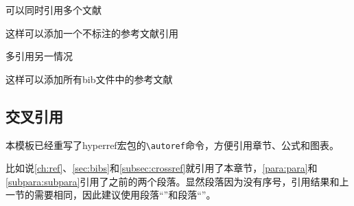 \documentclass{CustGraduPaper}
\begin{document}
可以同时引用多个文献\cite{Stone_1998,9780124467422,huagongrenzheng2014}

这样可以添加一个不标注的参考文献引用\nocite{9787508342894}

多引用另一情况\cite{Stone_1998,9780124467422,huagongrenzheng2014,bamboosilk}

这样可以添加所有bib文件中的参考文献\nocite{*}

\subsection{交叉引用}\label{subsec:crossref}
本模板已经重写了hyperref宏包的\verb|\autoref|命令，方便引用章节、公式和图表。

比如说\autoref{ch:ref}、\autoref{sec:bibs}和\autoref{subsec:crossref}就引用了本章节，\autoref{para:para}和\autoref{subpara:subpara}引用了之前的两个段落。显然段落因为没有序号，引用结果和上一节的需要相同，因此建议使用段落“”和段落“”。

\end{document}
